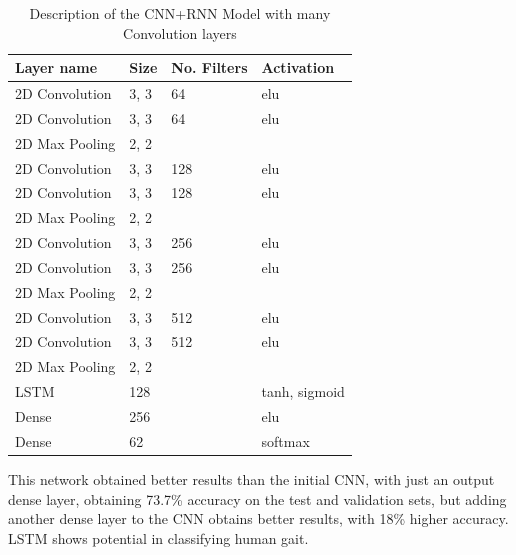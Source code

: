 \documentclass[12pt]{article}
\theoremstyle{definition}
\begin{document}
	\begin{table}[ht]
		\centering
		\renewcommand{\arraystretch}{1.5}

		\caption{Description of the CNN+RNN Model with many Convolution layers}
		\label{table:big-CNN-LSTM}

		\begin{tabularx}{\textwidth}{XXXX}
			\textbf{Layer name} & \textbf{Size} & \textbf{No. Filters} & \textbf{Activation} \\ \hline
			2D Convolution & 3, 3 & 64                   & elu                  \\ \hline
			2D Convolution & 3, 3 & 64                   & elu                  \\ \hline
			2D Max Pooling & 2, 2 & \textbf{\textendash} & \textbf{\textendash} \\ \hline
			2D Convolution & 3, 3 & 128                  & elu                  \\ \hline
			2D Convolution & 3, 3 & 128                  & elu                  \\ \hline
			2D Max Pooling & 2, 2 & \textbf{\textendash} & \textbf{\textendash} \\ \hline
			2D Convolution & 3, 3 & 256                  & elu                  \\ \hline
			2D Convolution & 3, 3 & 256                  & elu                  \\ \hline
			2D Max Pooling & 2, 2 & \textbf{\textendash} & \textbf{\textendash} \\ \hline
			2D Convolution & 3, 3 & 512                  & elu                  \\ \hline
			2D Convolution & 3, 3 & 512                  & elu                  \\ \hline
			2D Max Pooling & 2, 2 & \textbf{\textendash} & \textbf{\textendash} \\ \hline
			LSTM           & 128  & \textbf{\textendash} & tanh, sigmoid        \\ \hline
			Dense          & 256  & \textbf{\textendash} & elu                  \\ \hline
			Dense          & 62   & \textbf{\textendash} & softmax              \\
		\end{tabularx}
	\end{table}

	This network obtained better results than the initial CNN, with just an output dense layer, obtaining 73.7\% accuracy on the test and validation sets, but adding another dense layer to the CNN obtains better results, with 18\% higher accuracy. LSTM shows potential in classifying human gait.
\end{document}
